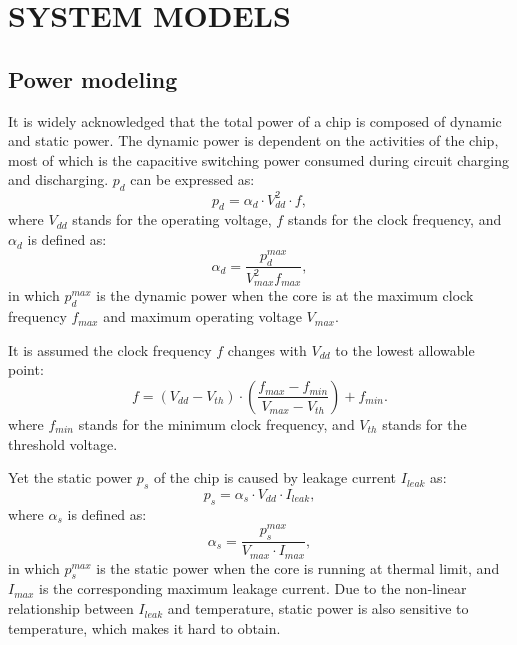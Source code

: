 \section{SYSTEM MODELS}

\subsection{Power modeling}

It is widely acknowledged that the total power of a chip is composed of dynamic and static power. The dynamic power is dependent on the activities of the chip, most of which is the capacitive switching power consumed during circuit charging and discharging. $p_{d}$ can be expressed as:
\begin{equation}\label{eq:dyn_power}
p_{d} = \alpha_{d} \cdot V_{dd}^{2} \cdot f,
\end{equation}
where $V_{dd}$ stands for the operating voltage, $f$ stands for the clock frequency, and $\alpha_{d}$ is defined as:
\begin{equation}\label{eq:alpha_d}
\alpha_{d} = \frac{p^{max}_{d}}{V_{max}^{2}f_{max}},
\end{equation}
in which $p^{max}_{d}$ is the dynamic power when the core is at the maximum clock frequency $f_{max}$ and maximum operating voltage $V_{max}$.

It is assumed the clock frequency $f$ changes with $V_{dd}$ to the lowest allowable point:
\begin{equation}\label{eq:f_v}
f = (V_{dd}-V_{th}) \cdot (\frac{f_{max}-f_{min}}{V_{max}-V_{th}})+f_{min}.
\end{equation}
where $f_{min}$ stands for the minimum clock frequency, and $V_{th}$ stands for the threshold voltage.

Yet the static power $p_{s}$ of the chip is caused by leakage current $I_{leak}$ as:
\begin{equation}\label{eq:sta_power}
p_{s} = \alpha_{s}\cdot V_{dd} \cdot I_{leak},
\end{equation}
where $\alpha_{s}$ is defined as:
\begin{equation}\label{eq:alpha_s}
\alpha_{s} = \frac{p^{max}_{s}}{V_{max}\cdot I_{max}},
\end{equation}
in which $p^{max}_{s}$ is the static power when the core is running at thermal limit, and $I_{max}$ is the corresponding maximum leakage current. Due to the non-linear relationship between $I_{leak}$ and temperature, static power is also sensitive to temperature, which makes it hard to obtain.

